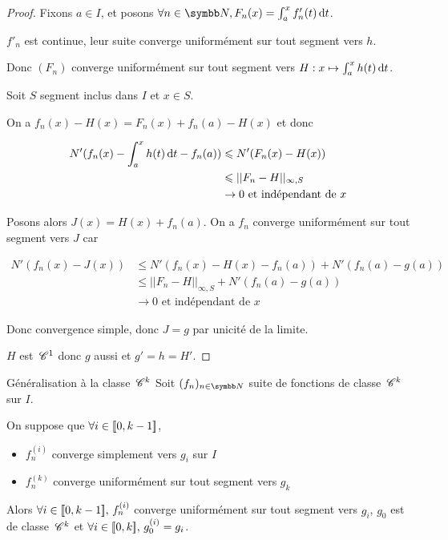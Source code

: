 
\begin{proof}
    Fixons $a \in I$, et posons $\forall n \in \N, F_n(x) = \int_{a}^{x } f_n'(t) \dt$.

    $f'_n$ est continue, leur suite converge uniformément sur tout segment vers $h$. 

    Donc $(F_n)$ converge uniformément sur tout segment vers $H : x \mapsto \int_a^x h(t) \,\mathrm{d}t$.

    \avspace Soit $S$ segment inclus dans $I$ et $x \in S$. 
    
    On a 
    $f_n(x) - H(x) = F_n(x) + f_n(a) - H(x)$ et donc 

    \begin{align}
        N'(f_n(x) - \int_{a }^{x } h(t) \,\mathrm{d}t - f_n(a)) & \leqslant N'(F_n(x) - H(x)) \\
        & \leqslant ||F_n - H||_{\infty, S} \\
        & \to 0 \text{ et indépendant de } x
    \end{align}

    Posons alors $J(x) = H(x) + f_n(a)$. On a $f_n$ converge uniformément sur tout segment vers 
    $J$ car  
    
    \begin{align}
        N'(f_n(x) - J(x)) & \leqslant N'(f_n(x) - H(x) - f_n(a)) + N'(f_n(a) - g(a)) \\
        & \leqslant ||F_n - H||_{\infty, S} + N'(f_n(a) - g(a)) \\
        & \to 0 \text{ et indépendant de } x
    \end{align}

    Donc convergence simple, donc $J = g$ par unicité de la limite. 

    $H$ est $\,\mathscr C^{1}$ donc $g$ aussi et $g' = h = H'$.
\end{proof}

\begin{theoreme}{Généralisation à la classe $\,\mathscr C^{k}$}{}
    Soit $(f_n)_{n \in \N}$ suite de fonctions de classe $\,\mathscr C^{k}$ sur $I$. 

    On suppose que  $\forall i \in [\![0, k - 1]\!]$, 
    \begin{itemize}
        \item $f_n^{(i)}$ converge simplement vers $g_i$ sur $I$
        \item $f_n^{(k)}$ converge uniformément sur tout segment vers $g_k$
    \end{itemize}

    Alors $\forall i \in [\![0, k - 1]\!], \, f_n^{(i)}$ converge uniformément sur tout segment vers $g_i$,
    $g_0$ est de classe $\,\mathscr C^{k}$ et $\forall i \in [\![0, k]\!], \, g_0^{(i)} = g_i$.
\end{theoreme}

